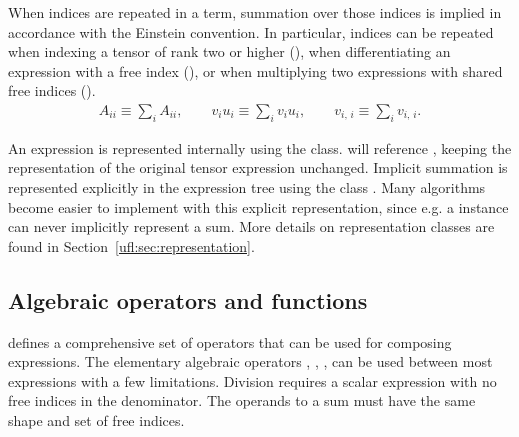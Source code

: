 When indices are repeated in a term, summation over those indices is
implied in accordance with the Einstein convention.  In particular,
indices can be repeated when indexing a tensor of rank two or higher
(), when differentiating an expression with a free index
(), or when multiplying two expressions with shared
free indices ().
\begin{align}
A_{ii}  \equiv \sum_i A_{ii}, \qquad
v_i u_i \equiv \sum_i v_i u_i, \qquad
v_{i,\,i} \equiv \sum_i v_{i,\,i}.
\end{align}

An expression  is represented internally using the
 class.   will reference , keeping the
representation of the original tensor expression  unchanged.
Implicit summation is represented explicitly in the expression tree using
the class .  Many algorithms become easier to implement
with this explicit representation, since e.g. a  instance
can never implicitly represent a sum.  More details on representation
classes are found in Section~\ref{ufl:sec:representation}.

\subsection{Algebraic operators and functions} \label{ufl:sec:algebra}

\ufl{} defines a comprehensive set of operators that can be used for
composing expressions.  The elementary algebraic operators \emp{+},
\emp{-}, \emp{*}, \emp{/} can be used between most \ufl{}
expressions with a few limitations.  Division requires a scalar
expression with no free indices in the denominator.  The operands to a
sum must have the same shape and set of free indices.

